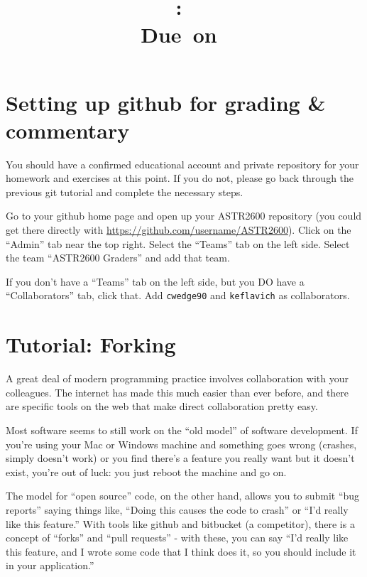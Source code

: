 \documentclass{article}
\title{\vspace{2in}\textmd{\textbf{\hmwkClass:\ \hmwkTitle}}\\\normalsize\vspace{0.1in}\small{Due\ on\ \hmwkDueDate}\\\vspace{0.1in}\large{}\vspace{3in}}
\date{}
\begin{document}
\begin{spacing}{1.0}
\newpage

\section{Setting up github for grading \& commentary}
You should have a confirmed educational account and private repository for
your homework and exercises at this point.  If you do not, please go back through
the previous git tutorial and complete the necessary steps.

Go to your github home page and open up your ASTR2600 repository (you could get
there directly with \url{https://github.com/username/ASTR2600}).  Click on the
``Admin'' tab near the top right.  Select the ``Teams'' tab on the left side.
Select the team ``ASTR2600 Graders'' and add that team.

If you don't have a ``Teams'' tab on the left side, but you DO have a
``Collaborators'' tab, click that.  Add \texttt{cwedge90} and
\texttt{keflavich} as collaborators.


\section{Tutorial: Forking}

A great deal of modern programming practice involves collaboration with your
colleagues.  The internet has made this much easier than ever before, and there
are specific tools on the web that make direct collaboration pretty easy.

Most software seems to still work on the ``old model'' of software development.
If you're using your Mac or Windows machine and something goes wrong (crashes,
simply doesn't work) or you find there's a feature you really want but it
doesn't exist, you're out of luck: you just reboot the machine and go on.

The model for ``open source'' code, on the other hand, allows you to submit
``bug reports'' saying things like, ``Doing this causes the code to crash'' or
``I'd really like this feature.''   With tools like github and bitbucket (a
competitor), there is a concept of ``forks'' and ``pull requests'' - with
these, you can say ``I'd really like this feature, and I wrote some code that I
think does it, so you should include it in your application.''


\end{spacing}
\end{document}
